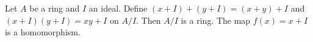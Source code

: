 Let $A$ be a ring and $I$ an ideal. Define $(x+I)+(y+I)=(x+y)+I$ and $(x+I)(y+I)=xy+I$ on $A/I$. Then $A/I$ is a ring. The map $f(x)=x+I$ is a homomorphism.
